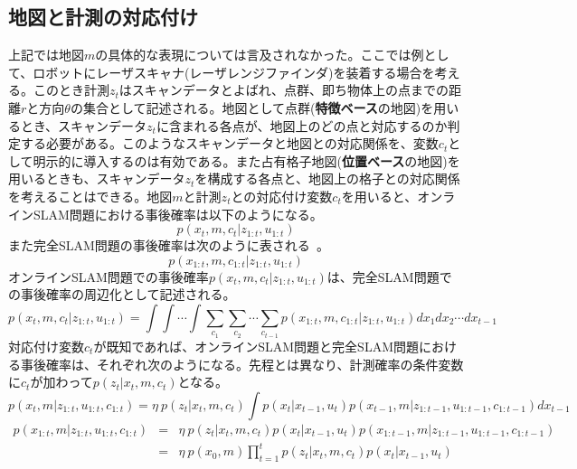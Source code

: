 \documentclass[dvipdfmx,a4paper]{jsarticle}
\begin{document}
\subsection{地図と計測の対応付け}
上記では地図$m$の具体的な表現については言及されなかった。ここでは例として、ロボットにレーザスキャナ(レーザレンジファインダ)を装着する場合を考える。このとき計測$z_t$はスキャンデータとよばれ、点群、即ち物体上の点までの距離$r$と方向$\theta$の集合として記述される。地図として点群(\textbf{特徴ベース}の地図)を用いるとき、スキャンデータ$z_t$に含まれる各点が、地図上のどの点と対応するのか判定する必要がある。このようなスキャンデータと地図との対応関係を、変数$c_t$として明示的に導入するのは有効である。また占有格子地図(\textbf{位置ベース}の地図)を用いるときも、スキャンデータ$z_t$を構成する各点と、地図上の格子との対応関係を考えることはできる。地図$m$と計測$z_t$との対応付け変数$c_t$を用いると、オンラインSLAM問題における事後確率は以下のようになる。
\begin{equation}
	p(x_t, m, c_t | z_{1 : t}, u_{1 : t})
\end{equation}
また完全SLAM問題の事後確率は次のように表される~\cite{Thrun07}\cite{Tomono16}\cite{Tomono18}。
\begin{equation}
	p(x_{1 : t}, m, c_{1 : t} | z_{1 : t}, u_{1 : t})
\end{equation}
オンラインSLAM問題での事後確率$p(x_t, m, c_t | z_{1 : t}, u_{1 : t})$は、完全SLAM問題での事後確率の周辺化として記述される。
\begin{equation}
	p(x_t, m, c_t | z_{1 : t}, u_{1 : t}) = \int \int \cdots \int \sum_{c_1} \sum_{c_2} \cdots \sum_{c_{t - 1}} p(x_{1 : t}, m, c_{1 : t} | z_{1 : t}, u_{1 : t}) dx_1 dx_2 \cdots dx_{t - 1}
\end{equation}
対応付け変数$c_t$が既知であれば、オンラインSLAM問題と完全SLAM問題における事後確率は、それぞれ次のようになる。先程とは異なり、計測確率の条件変数に$c_t$が加わって$p(z_t | x_t, m, c_t)$となる。
\begin{equation}
	p(x_t, m | z_{1 : t}, u_{1 : t}, c_{1 : t}) = \eta \ p(z_t | x_t, m, c_t) \int p(x_t | x_{t - 1}, u_t) p(x_{t - 1}, m | z_{1 : t - 1}, u_{1 : t - 1}, c_{1 : t - 1}) dx_{t - 1}
\end{equation}
\begin{eqnarray}
	p(x_{1 : t}, m | z_{1 : t}, u_{1 : t}, c_{1 : t}) &=& \eta \ p(z_t | x_t, m, c_t) p(x_t | x_{t - 1}, u_t) p(x_{1 : t - 1}, m | z_{1 : t - 1}, u_{1 : t - 1}, c_{1 : t - 1}) \\
	&=& \eta \ p(x_0, m) \prod_{t = 1}^t p(z_t | x_t, m, c_t) p(x_t | x_{t - 1}, u_t)
\end{eqnarray}
\end{document}
